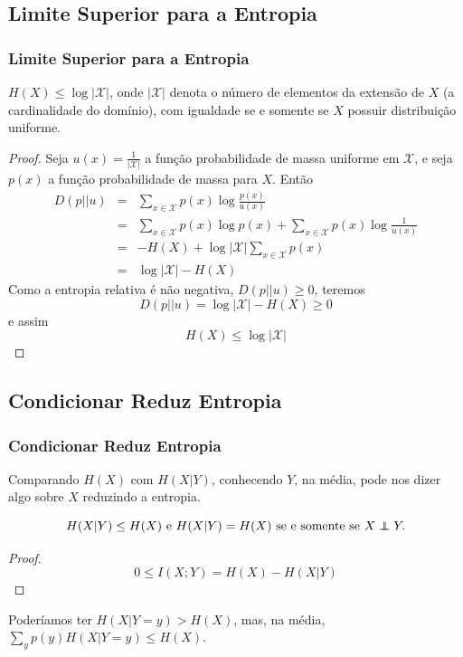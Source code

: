 \subsection{Limite Superior para a Entropia}
\begin{frame}[allowframebreaks]
  \frametitle{Limite Superior para a Entropia}
  \begin{theorem}
  $H(X) \leq \log \vert \mathcal{X} \vert$, onde $\vert \mathcal{X} \vert$ denota
  o número de elementos da extensão de $X$ (a cardinalidade do domínio), com igualdade
  se e somente se $X$ possuir distribuição uniforme.
  \end{theorem}

  \framebreak

  \begin{proof}
  Seja $u(x) = \frac{1}{\vert \mathcal{X} \vert}$ a função probabilidade de massa uniforme
  em $\mathcal{X}$, e seja $p(x)$ a função probabilidade de massa para $X$. Então
  \begin{eqnarray}
  D(p||u) &=& \sum_{x \in \mathcal{X}} p(x) \log \frac{p(x)}{u(x)} \nonumber \\
        &=& \sum_{x \in \mathcal{X}} p(x) \log p(x) + \sum_{x \in \mathcal{X}} p(x) \log \frac{1}{u(x)} \nonumber \\
        &=& -H(X) + \log \vert \mathcal{X} \vert \sum_{x \in \mathcal{X}} p(x) \nonumber \\
        &=& \log \vert \mathcal{X} \vert - H(X)
  \end{eqnarray}
  \proofbreak
  Como a entropia relativa é não negativa, $D(p||u) \geq 0$, teremos
  \begin{equation}
  D(p||u) = \log \vert \mathcal{X} \vert - H(X) \geq 0
  \end{equation}
  e assim
  \begin{equation}
  H(X) \leq \log \vert \mathcal{X} \vert
  \end{equation}
  \end{proof}
\end{frame}


\subsection{Condicionar Reduz Entropia}
\begin{frame}%
  \frametitle{Condicionar Reduz Entropia}
  Comparando $H(X)$ com $H(X|Y)$, conhecendo $Y$, na média, pode nos dizer algo sobre $X$
  reduzindo a entropia.
  \begin{proposition}
  \begin{equation}
  H(X|Y) \leq H(X) \text{ e } H(X|Y) = H(X) \text{ se e somente se } X \independent Y.
  \end{equation}
  \end{proposition}

  \begin{proof}
  \begin{equation}
  0 \leq I(X;Y) = H(X) - H(X|Y)
  \end{equation}
  \end{proof}

  Poderíamos ter $H(X|Y=y) > H(X)$, mas, na média, $\sum_y p(y) H(X|Y=y) \leq H(X)$.
\end{frame}


